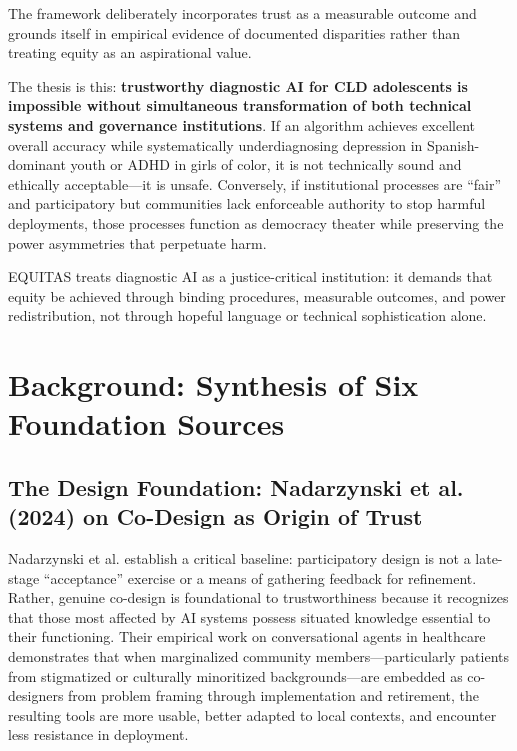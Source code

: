 \documentclass[12pt,a4paper]{article}
\begin{document}
The framework deliberately incorporates trust as a measurable outcome \cite{sagona2025} and grounds itself in empirical evidence of documented disparities \cite{marko2025} rather than treating equity as an aspirational value.

The thesis is this: \textbf{trustworthy diagnostic AI for CLD adolescents is impossible without simultaneous transformation of both technical systems and governance institutions}. If an algorithm achieves excellent overall accuracy while systematically underdiagnosing depression in Spanish-dominant youth or ADHD in girls of color, it is not technically sound and ethically acceptable—it is unsafe.\cite{marko2025} Conversely, if institutional processes are ``fair'' and participatory but communities lack enforceable authority to stop harmful deployments, those processes function as democracy theater while preserving the power asymmetries that perpetuate harm.\cite{munn_idai700}

EQUITAS treats diagnostic AI as a justice-critical institution: it demands that equity be achieved through binding procedures, measurable outcomes, and power redistribution, not through hopeful language or technical sophistication alone.

\section{Background: Synthesis of Six Foundation Sources}

\subsection{The Design Foundation: Nadarzynski et al. (2024) on Co-Design as Origin of Trust}

Nadarzynski et al. establish a critical baseline: participatory design is not a late-stage ``acceptance'' exercise or a means of gathering feedback for refinement. Rather, genuine co-design is foundational to trustworthiness because it recognizes that those most affected by AI systems possess situated knowledge essential to their functioning.\cite{nadarzynski2024} Their empirical work on conversational agents in healthcare demonstrates that when marginalized community members—particularly patients from stigmatized or culturally minoritized backgrounds—are embedded as co-designers from problem framing through implementation and retirement, the resulting tools are more usable, better adapted to local contexts, and encounter less resistance in deployment.\cite{nadarzynski2024}
\end{document}
